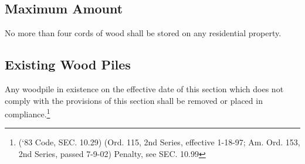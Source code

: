 \subsection{Maximum Amount}
No more than four cords of wood shall be stored on any residential property.
\subsection{Existing Wood Piles}
Any woodpile in existence on the effective date of this section which does not comply with the provisions of this section shall be removed or placed in compliance.\footnote{(‘83 Code, SEC. 10.29)  (Ord. 115, 2nd Series, effective 1-18-97; Am. Ord. 153, 2nd Series, passed 7-9-02)  Penalty, see SEC. 10.99}
